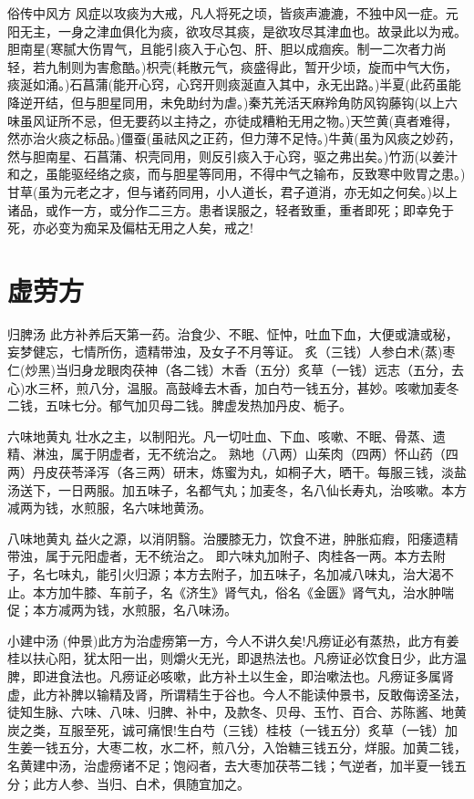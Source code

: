 \documentclass[a4paper,12pt,UTF8,twoside]{ctexbook}
\begin{document}
    俗传中风方
    风症以攻痰为大戒，凡人将死之顷，皆痰声漉漉，不独中风一症。元阳无主，一身之津血俱化为痰，欲攻尽其痰，是欲攻尽其津血也。故录此以为戒。
    胆南星(寒腻大伤胃气，且能引痰入于心包、肝、胆以成痼疾。制一二次者力尚轻，若九制则为害愈酷。)枳壳(耗散元气，痰盛得此，暂开少顷，旋而中气大伤，痰涎如涌。)石菖蒲(能开心窍，心窍开则痰涎直入其中，永无出路。)半夏(此药虽能降逆开结，但与胆星同用，未免助纣为虐。)秦艽羌活天麻羚角防风钩藤钩(以上六味虽风证所不忌，但无要药以主持之，亦徒成糟粕无用之物。)天竺黄(真者难得，然亦治火痰之标品。)僵蚕(虽祛风之正药，但力薄不足恃。)牛黄(虽为风痰之妙药，然与胆南星、石菖蒲、枳壳同用，则反引痰入于心窍，驱之弗出矣。)竹沥(以姜汁和之，虽能驱经络之痰，而与胆星等同用，不得中气之输布，反致寒中败胃之患。)甘草(虽为元老之才，但与诸药同用，小人道长，君子道消，亦无如之何矣。)以上诸品，或作一方，或分作二三方。患者误服之，轻者致重，重者即死；即幸免于死，亦必变为痴呆及偏枯无用之人矣，戒之! 
    
    \chapter{虚劳方}
    归脾汤
    此方补养后天第一药。治食少、不眠、怔忡，吐血下血，大便或溏或秘，妄梦健忘，七情所伤，遗精带浊，及女子不月等证。
    炙（三钱）人参白术(蒸)枣仁(炒黑)当归身龙眼肉茯神（各二钱）木香（五分）炙草（一钱）远志（五分，去心)水三杯，煎八分，温服。高鼓峰去木香，加白芍一钱五分，甚妙。咳嗽加麦冬二钱，五味七分。郁气加贝母二钱。脾虚发热加丹皮、栀子。
    
    六味地黄丸
    壮水之主，以制阳光。凡一切吐血、下血、咳嗽、不眠、骨蒸、遗精、淋浊，属于阴虚者，无不统治之。
    熟地（八两）山茱肉（四两）怀山药（四两）丹皮茯苓泽泻（各三两）研末，炼蜜为丸，如桐子大，晒干。每服三钱，淡盐汤送下，一日两服。加五味子，名都气丸；加麦冬，名八仙长寿丸，治咳嗽。本方减两为钱，水煎服，名六味地黄汤。
    
    八味地黄丸
    益火之源，以消阴翳。治腰膝无力，饮食不进，肿胀疝瘕，阳痿遗精带浊，属于元阳虚者，无不统治之。
    即六味丸加附子、肉桂各一两。本方去附子，名七味丸，能引火归源；本方去附子，加五味子，名加减八味丸，治大渴不止。本方加牛膝、车前子，名《济生》肾气丸，俗名《金匮》肾气丸，治水肿喘促；本方减两为钱，水煎服，名八味汤。
    
    小建中汤
    (仲景)此方为治虚痨第一方，今人不讲久矣!凡痨证必有蒸热，此方有姜桂以扶心阳，犹太阳一出，则爝火无光，即退热法也。凡痨证必饮食日少，此方温脾，即进食法也。凡痨证必咳嗽，此方补土以生金，即治嗽法也。凡痨证多属肾虚，此方补脾以输精及肾，所谓精生于谷也。今人不能读仲景书，反敢侮谤圣法，徒知生脉、六味、八味、归脾、补中，及款冬、贝母、玉竹、百合、苏陈酱、地黄炭之类，互服至死，诚可痛恨!生白芍（三钱）桂枝（一钱五分）炙草（一钱）加生姜一钱五分，大枣二枚，水二杯，煎八分，入饴糖三钱五分，烊服。加黄二钱，名黄建中汤，治虚痨诸不足；饱闷者，去大枣加茯苓二钱；气逆者，加半夏一钱五分；此方人参、当归、白术，俱随宜加之。
    
\end{document}

